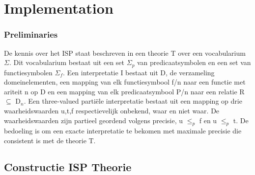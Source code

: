 \chapter{Implementation}
\label{cha:implementation}

\subsection{Preliminaries}
De kennis over het ISP staat beschreven in een theorie T over een vocabularium $\Sigma$. Dit vocabularium bestaat uit een set $\Sigma_{p}$ van predicaatsymbolen en een set van functiesymbolen $\Sigma_{f}$. Een interpretatie I bestaat uit D, de verzameling domeinelementen, een mapping van elk functiesymbool f/n naar een functie met ariteit n op D en een mapping van elk predicaatsymbool P/n naar een relatie R $\subseteq$ D$_{n}$. Een three-valued parti\"{e}le interpretatie bestaat uit een mapping op drie waarheidswaarden {u,t,f} respectievelijk onbekend, waar en niet waar. De waarheidswaarden zijn partieel geordend volgens precisie, u $\leq_{p}$ f en u $\leq_{p}$ t. De bedoeling is om een exacte interpretatie te bekomen met maximale precisie die consistent is met de theorie T.

\section{Constructie ISP Theorie}

